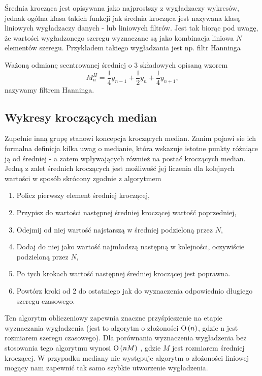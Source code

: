 \documentclass[10pt,a4paper]{book}
\begin{document}
Średnia krocząca jest opisywana jako najprostszy z wygładzaczy wykresów, jednak ogólna klasa takich funkcji jak średnia krocząca jest nazywana klasą liniowych wygładzaczy danych - lub liniowych filtrów. Jest tak biorąc pod uwagę, że wartości wygładzonego szeregu wyznaczane są jako kombinacja liniowa $N$ elementów szeregu. Przykładem takiego wygładzania jest np. filtr Hanninga

\begin{definition}
Ważoną odmianę scentrowanej średniej o 3 składowych opisaną wzorem
$$
M_n^H = \frac{1}{4} y_{n-1} + \frac{1}{2} y_n + \frac{1}{4} y_{n+1},
$$
nazywamy filtrem Hanninga.
\end{definition}

\subsection{Wykresy kroczących median}

Zupełnie inną grupę stanowi koncepcja kroczących median. Zanim pojawi sie ich formalna definicja kilka uwag o medianie, która wskazuje istotne punkty różniące ją od średniej - a zatem wpływających również na postać kroczących median. Jedną z zalet średnich kroczących jest możliwość jej liczenia dla kolejnych wartości w sposób skrócony zgodnie z algorytmem

\begin{enumerate}
\item Policz pierwszy element średniej kroczącej,
\item Przypisz do wartości następnej średniej kroczącej wartość poprzedniej,
\item Odejmij od niej wartość najstarszą w średniej podzieloną przez $N$,
\item Dodaj do niej jako wartość najmłodszą następną w kolejności, oczywiście podzieloną przez $N$,
\item Po tych krokach wartość następnej średniej kroczącej jest poprawna.
\item Powtórz kroki od 2 do ostatniego jak do wyznaczenia odpowiednio długiego szeregu czasowego.
\end{enumerate}

Ten algorytm obliczeniowy zapewnia znaczne przyśpieszenie na etapie wyznaczania wygładzenia (jest to algorytm o złożoności $\operatorname{O} \left( {n} \right)$, gdzie n jest rozmiarem szeregu czasowego). Dla porównania wyznaczenia wygładzenia bez stosowania tego algorytmu wynosi $\operatorname{O} \left( {n M} \right)$ , gdzie $M$ jest rozmiarem średniej kroczącej. W przypadku mediany nie występuje algorytm o złożoności liniowej mogący nam zapewnić tak samo szybkie utworzenie wygładzenia.
\end{document}
